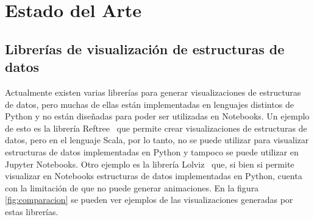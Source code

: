\chapter{Estado del Arte}


\section{Librerías de visualización de estructuras de datos}

Actualmente existen varias librerías para generar visualizaciones de estructuras de datos, pero muchas de ellas están implementadas en lenguajes distintos de Python y no están diseñadas para poder ser utilizadas en Notebooks.
Un ejemplo de esto es la librería Reftree~\cite{Stanch2021} que permite crear visualizaciones de estructuras de datos, pero en el lenguaje Scala, por lo tanto, no se puede utilizar para visualizar estructuras de datos implementadas en Python y tampoco se puede utilizar en Jupyter Notebooks.
Otro ejemplo es la librería Lolviz~\cite{Lolviz} que, si bien si permite visualizar en Notebooks estructuras de datos implementadas en Python, cuenta con la limitación de que no puede generar animaciones. En la figura \ref{fig:comparacion} se pueden ver ejemplos de las visualizaciones generadas por estas librerías.

